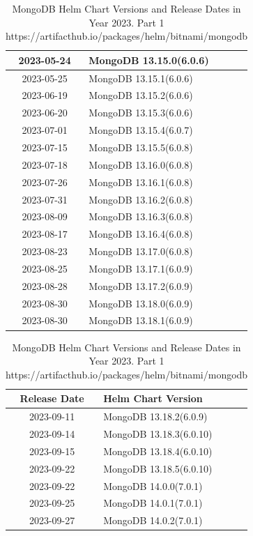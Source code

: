 \documentclass[../main.tex]{subfiles}
\begin{document}
\begin{table}[h]
\begin{minipage}{0.45\textwidth}
\begin{tabular}{|c|l|}
    2023-05-24 & MongoDB 13.15.0(6.0.6) \\ \hline  
    2023-05-25 & MongoDB 13.15.1(6.0.6) \\ \hline 
    2023-06-19 & MongoDB 13.15.2(6.0.6) \\ \hline 
    2023-06-20 & MongoDB 13.15.3(6.0.6) \\ \hline 
    2023-07-01 & MongoDB 13.15.4(6.0.7) \\ \hline 
    2023-07-15 & MongoDB 13.15.5(6.0.8) \\ \hline  
    2023-07-18 & MongoDB 13.16.0(6.0.8) \\ \hline 
    2023-07-26 & MongoDB 13.16.1(6.0.8) \\ \hline  
    2023-07-31 & MongoDB 13.16.2(6.0.8) \\ \hline
    2023-08-09 & MongoDB 13.16.3(6.0.8) \\ \hline
    2023-08-17 & MongoDB 13.16.4(6.0.8) \\ \hline  
    2023-08-23 & MongoDB 13.17.0(6.0.8) \\ \hline
    2023-08-25 & MongoDB 13.17.1(6.0.9) \\ \hline
    2023-08-28 & MongoDB 13.17.2(6.0.9) \\ \hline 
    2023-08-30 & MongoDB 13.18.0(6.0.9) \\ \hline  
    2023-08-30 & MongoDB 13.18.1(6.0.9) \\ \hline
\end{tabular}
\caption{MongoDB Helm Chart Versions and Release Dates in Year 2023. Part 1 https://artifacthub.io/packages/helm/bitnami/mongodb}
\end{minipage}
\hspace{1cm} %
\begin{minipage}{0.45\textwidth}
\centering
\begin{tabular}{|c|l|}
\hline
\textbf{Release Date} & \textbf{Helm Chart Version} \\ \hline
    2023-09-11 & MongoDB 13.18.2(6.0.9) \\ \hline
    2023-09-14 & MongoDB 13.18.3(6.0.10) \\ \hline  
    2023-09-15 & MongoDB 13.18.4(6.0.10) \\ \hline  
    2023-09-22 & MongoDB 13.18.5(6.0.10) \\ \hline  
    2023-09-22 & MongoDB 14.0.0(7.0.1) \\ \hline  
    2023-09-25 & MongoDB 14.0.1(7.0.1) \\ \hline  
    2023-09-27 & MongoDB 14.0.2(7.0.1) \\ \hline  

\end{tabular}
\end{minipage}
\end{table}
\end{document}
